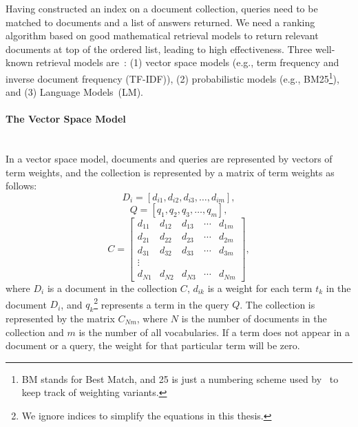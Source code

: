 Having constructed an index on a document collection, queries need to 
be matched to documents and a list of answers returned. We need a ranking algorithm based on good mathematical retrieval models to 
return relevant documents at top of the ordered list, leading to high effectiveness. 
Three well-known retrieval models are~\citep{croft2010search}: (1) vector space models (e.g., term frequency and inverse document frequency (TF-IDF)), (2) probabilistic models (e.g., BM25\footnote{BM stands for Best Match, and 25 is just a numbering scheme used by~\cite{robertson1994some} to keep track of weighting variants.}), and (3) Language Models~(LM). 

\paragraph{The Vector Space Model}
\ \\
In a vector space model, documents and queries are represented by vectors of term weights, and the collection is represented by a matrix of term weights as follows: 
\begin{displaymath} 
D_{i}=[d_{i1}, d_{i2}, d_{i3}, \ldots , d_{im}],
\end{displaymath}
\begin{displaymath} 
Q=[q_{1}, q_{2}, q_{3}, \ldots , q_{m}],
\end{displaymath}
\begin{displaymath} 
C=
\begin{bmatrix}
        d_{11} & d_{12} & d_{13} & \cdots & d_{1m}\\
        d_{21} & d_{22} & d_{23} & \cdots & d_{2m}\\
        d_{31} & d_{32} & d_{33} & \cdots & d_{3m}\\
        \vdots\\
        d_{N1} & d_{N2} & d_{N3} & \cdots & d_{Nm}
     \end{bmatrix},
\end{displaymath}
\noindent
where $ D_{i} $ is a document in the collection $ C $, $ d_{ik} $ is a weight for each term $ t_{k} $ in the document $ D_{i} $, and $ q_{k} $\footnote{We ignore indices to simplify the equations in this thesis.} represents a term in the query $ Q $. The collection is represented by the matrix $C_{Nm}$, where $N$ is the number of documents in the collection and $m$ is the number of all vocabularies. If a term does not appear in a document or a query, the weight for that particular term will be zero. 

